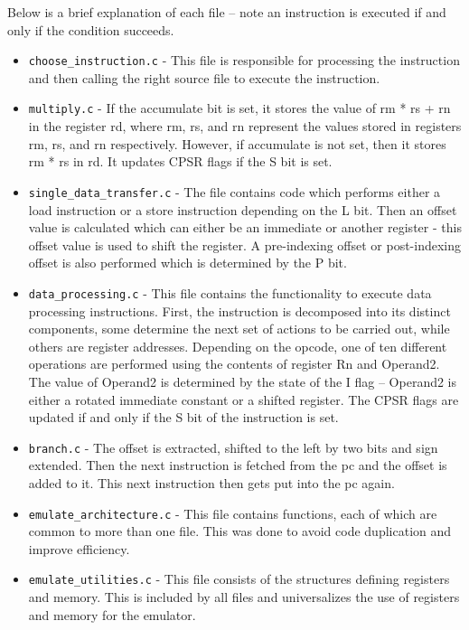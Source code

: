 \documentclass[11pt]{article}
\begin{document}
Below is a brief explanation of each file – note an instruction is executed if and only if the condition succeeds. 
\begin{itemize}
    \item \texttt{choose\_instruction.c} - This file is responsible for processing the instruction and then calling the right source file to execute the instruction. 
    \item \texttt{multiply.c} - If the accumulate bit is set, it stores the value of rm * rs + rn in the register rd, where rm, rs, and rn represent the values stored in registers rm, rs, and rn respectively. However, if accumulate is not set, then it stores rm * rs in rd. It updates CPSR flags if the S bit is set. 
    \item \texttt{single\_data\_transfer.c} - The file contains code which performs either a load instruction or a store instruction depending on the L bit. Then an offset value is calculated which can either be an immediate or another register - this offset value is used to shift the register. A pre-indexing offset or post-indexing offset is also performed which is determined by the P bit. 
    \item \texttt{data\_processing.c} - This file contains the functionality to execute data processing instructions. First, the instruction is decomposed into its distinct components, some determine the next set of actions to be carried out, while others are register addresses. Depending on the opcode, one of ten different operations are performed using the contents of register Rn and Operand2. The value of Operand2 is determined by the state of the I flag – Operand2 is either a rotated immediate constant or a shifted register. The CPSR flags are updated if and only if the S bit of the instruction is set. 
    \item \texttt{branch.c} - The offset is extracted, shifted to the left by two bits and sign extended. Then the next instruction is fetched from the pc and the offset is added to it. This next instruction then gets put into the pc again. 
    \item \texttt{emulate\_architecture.c} - This file contains functions, each of which are common to more than one file. This was done to avoid code duplication and improve efficiency. 
    \item \texttt{emulate\_utilities.c} - This file consists of the structures defining registers and memory. This is included by all files and universalizes the use of registers and memory for the emulator. 
    
\end{itemize}
\end{document}
